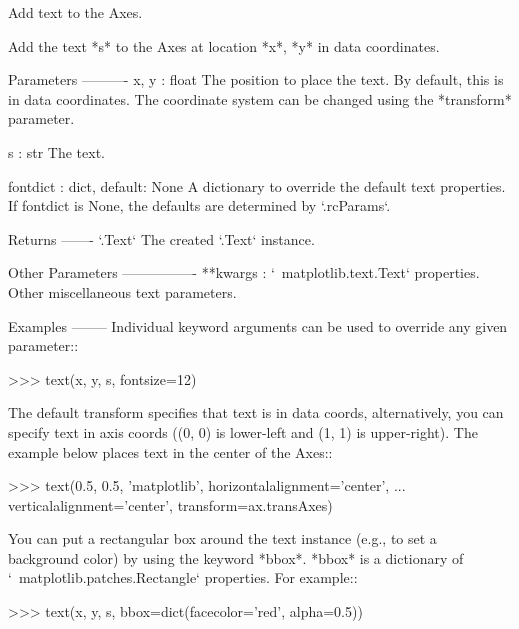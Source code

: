 \begin{DoxyVerb}
\begin{DoxyVerb}Add text to the Axes.

Add the text *s* to the Axes at location *x*, *y* in data coordinates.

Parameters
----------
x, y : float
    The position to place the text. By default, this is in data
    coordinates. The coordinate system can be changed using the
    *transform* parameter.

s : str
    The text.

fontdict : dict, default: None
    A dictionary to override the default text properties. If fontdict
    is None, the defaults are determined by `.rcParams`.

Returns
-------
`.Text`
    The created `.Text` instance.

Other Parameters
----------------
**kwargs : `~matplotlib.text.Text` properties.
    Other miscellaneous text parameters.


Examples
--------
Individual keyword arguments can be used to override any given
parameter::

    >>> text(x, y, s, fontsize=12)

The default transform specifies that text is in data coords,
alternatively, you can specify text in axis coords ((0, 0) is
lower-left and (1, 1) is upper-right).  The example below places
text in the center of the Axes::

    >>> text(0.5, 0.5, 'matplotlib', horizontalalignment='center',
    ...      verticalalignment='center', transform=ax.transAxes)

You can put a rectangular box around the text instance (e.g., to
set a background color) by using the keyword *bbox*.  *bbox* is
a dictionary of `~matplotlib.patches.Rectangle`
properties.  For example::

    >>> text(x, y, s, bbox=dict(facecolor='red', alpha=0.5))
\end{DoxyVerb}
 \mbox{\label{classmatplotlib_1_1axes_1_1__axes_1_1Axes_a9581821dd9373be3e779d81442d2a206}} 

\end{DoxyVerb}
